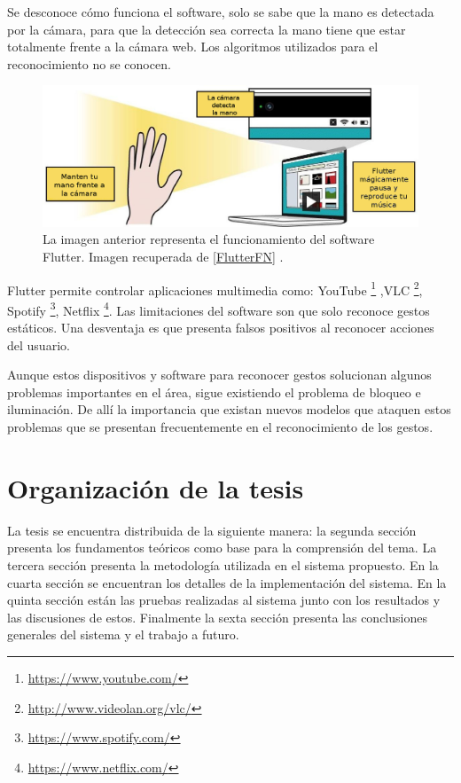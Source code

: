 Se desconoce cómo funciona el software, solo se sabe que la mano es detectada por la cámara, para que la detección sea correcta la mano tiene que estar totalmente frente a la cámara web. Los algoritmos utilizados para el reconocimiento no se conocen.  
\begin{figure}[h!]
\begin{center}
\includegraphics[scale=.4]{./Figures/Flutter.jpg}
\end{center}
\caption{La imagen anterior representa el funcionamiento del software Flutter. Imagen recuperada de \ref{FlutterFN} .}
\label{fig:Flutter}
\end{figure}

Flutter permite controlar aplicaciones multimedia como: YouTube \footnote{\url{https://www.youtube.com/}} ,VLC \footnote{\url{http://www.videolan.org/vlc/}}, Spotify \footnote{\url{https://www.spotify.com/}}, Netflix \footnote{\url{https://www.netflix.com/}}. Las limitaciones del software son que solo reconoce gestos estáticos. Una desventaja es que presenta falsos positivos al reconocer acciones del usuario.  


Aunque estos dispositivos y software para reconocer gestos solucionan algunos problemas importantes en el área, sigue existiendo el problema de bloqueo e iluminación.
De allí la importancia que existan nuevos modelos que ataquen estos problemas que se presentan frecuentemente en el reconocimiento de los gestos.
  
\section{Organizaci\'on de la tesis}\label{OrganizacionTesis}

La tesis se encuentra distribuida de la siguiente manera: la segunda sección presenta los fundamentos teóricos como base para la comprensión del tema. La tercera sección presenta la metodología utilizada en el sistema propuesto. En la cuarta sección se encuentran los detalles de la implementación del sistema. En la quinta sección están las pruebas realizadas al sistema junto con los resultados y las discusiones de estos. Finalmente la sexta sección presenta las conclusiones generales del sistema y el trabajo a futuro. 

